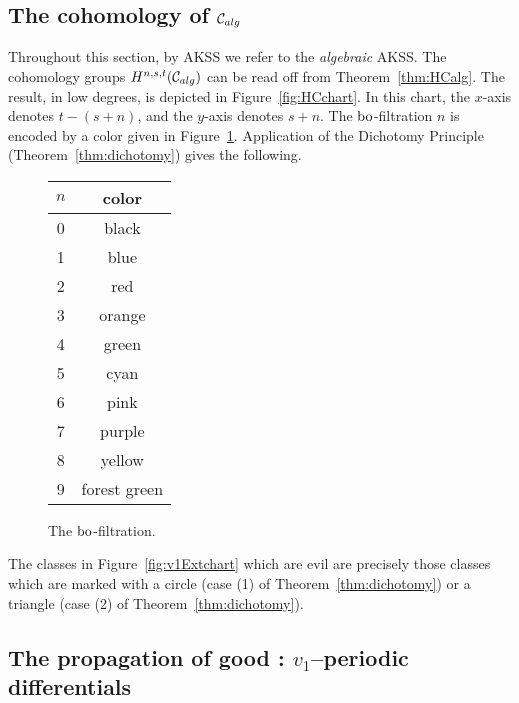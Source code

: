 \subsection*{The cohomology of $\mathcal{C}_{alg}$}
Throughout this section, by AKSS we refer to the \emph{algebraic} AKSS. The cohomology groups $H^{n,s,t}(\mathcal{C}_{alg})$ can be read off from Theorem~\ref{thm:HCalg}.  The result, in low degrees, is depicted in Figure~\ref{fig:HCchart}. In this chart, the $x$-axis denotes $t-(s+n)$, and the $y$-axis denotes $s+n$.  The $\mathrm{bo}$-filtration $n$ is encoded by a color given in Figure~\ref{fig:colorbo}.
Application of the Dichotomy Principle (Theorem~\ref{thm:dichotomy}) gives the following.

\begin{figure}
\begin{tabular}{ | c | c | }
  \hline
  $n$ & color \\
  \hline
  \hline
  0 & black  \\
  \hline
  1 & {\color{blue}blue}  \\
  \hline
  2 & {\color{red}red}   \\
  \hline
   3 & {\color{orange}orange}  \\
  \hline
   4 & {\color{limegreen}green} \\
  \hline
     5 & {\color{cyan}cyan} \\
  \hline
     6 & {\color{lavenderrose}pink} \\
  \hline
       7 & {\color{darkmagenta}purple} \\
  \hline
       8 & {\color{goldenpoppy}yellow} \\
  \hline
       9 & {\color{seagreen}forest green} \\
  \hline
\end{tabular}
\caption{The $\mathrm{bo}$-filtration.}
\label{fig:colorbo}
\end{figure}

\begin{prop}
The classes in Figure~\ref{fig:v1Extchart} which are evil are precisely those classes which are marked with a circle (case (1) of Theorem~\ref{thm:dichotomy}) or a triangle (case (2) of Theorem~\ref{thm:dichotomy}).
\end{prop}






\subsection*{The propagation of good : $v_1$--periodic differentials}

